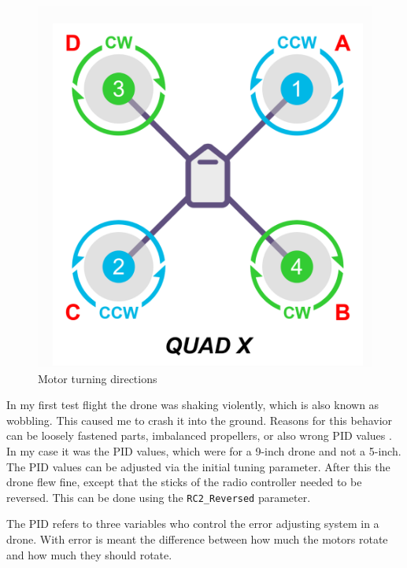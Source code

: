 \documentclass[svgnames]{article}
\begin{document}
\begin{figure}[ht]
	\centering
	\includegraphics[scale=0.4]{pictures/quadx}
	\caption{Motor turning directions}
	\label{fig:quadx}
\end{figure}
	In my first test flight the drone was shaking violently, which is also known as wobbling. This caused me to crash it into the ground. Reasons for this behavior can be loosely fastened parts, imbalanced propellers, or also wrong \gls{PID} values \cite{dronewobblevideo}. In my case it was the \gls{PID} values, which were for a 9-inch drone and not a 5-inch. The \gls{PID} values can be adjusted via the initial tuning parameter. After this the drone flew fine, except that the sticks of the radio controller needed to be reversed. This can be done using the \lstinline|RC2_Reversed| parameter.

	\begin{Explanation}
		\item The \gls{PID} refers to three variables who control the error adjusting system in a drone. With error is meant the difference between how much the motors rotate and how much they should rotate. 
	\end{Explanation}
	
\end{document}
